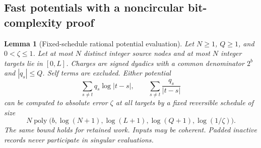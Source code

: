 \documentclass[11pt]{article}
\newtheorem{lemma}[theorem]{Lemma}
\theoremstyle{definition}
\newcommand{\poly}{\operatorname{poly}}
\begin{document}
\subsection{Fast potentials with a noncircular bit-complexity proof}

\begin{lemma}[Fixed-schedule rational potential evaluation]\label{lem:potential}
Let $N\ge1$, $Q\ge1$, and $0<\zeta\le1$. Let at most $N$ distinct integer source nodes and at most $N$ integer
targets lie in $[0,L]$. Charges are signed dyadics with a common denominator
$2^b$ and $|q_s|\le Q$. Self terms are excluded. Either potential
\[
 \sum_{s\ne t}q_s\log|t-s|,
 \qquad
 \sum_{s\ne t}\frac{q_s}{|t-s|}
\]
can be computed to absolute error $\zeta$ at all targets by a fixed
reversible schedule of size
\[
 N\poly\bigl(b,\log(N+1),\log(L+1),\log(Q+1),\log(1/\zeta)\bigr).
\]
The same bound holds for retained work. Inputs may be coherent. Padded
inactive records never participate in singular evaluations.
\end{lemma}
\end{document}
